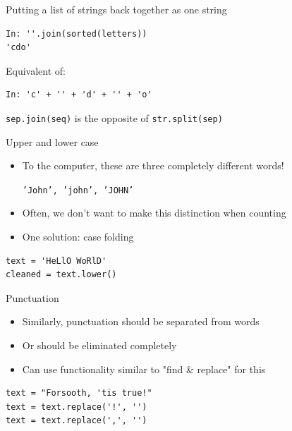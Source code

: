 \documentclass[aspectratio=169,usenames,dvipsnames]{beamer}
\begin{document}
\begin{frame}[fragile]{Putting a list of strings back together as one string}
\begin{lstlisting}
In: ''.join(sorted(letters))
'cdo'
\end{lstlisting}
Equivalent of:
\begin{lstlisting}
In: 'c' + '' + 'd' + '' + 'o'
\end{lstlisting}

\texttt{sep.join(seq)} is the opposite of \texttt{str.split(sep)}
\end{frame}

\begin{frame}[fragile]{Upper and lower case}
    \begin{itemize}
        \item To the computer, these
            are three completely different words!

            \texttt{'John', 'john', 'JOHN'}
        \item Often, we don't want to make this distinction when counting
        \item One solution: case folding
    \end{itemize}
    \pause
\begin{lstlisting}
text = 'HeLlO WoRlD'
cleaned = text.lower()
\end{lstlisting}
\end{frame}

\begin{frame}[fragile]{Punctuation}
    \begin{itemize}
        \item Similarly, punctuation should be separated from words
        \item Or should be eliminated completely
        \item Can use functionality similar to "find \& replace" for this
    \end{itemize}
    \pause
\begin{lstlisting}
text = "Forsooth, 'tis true!"
text = text.replace('!', '')
text = text.replace(',', '')
\end{lstlisting}
\end{frame}

\end{document}

